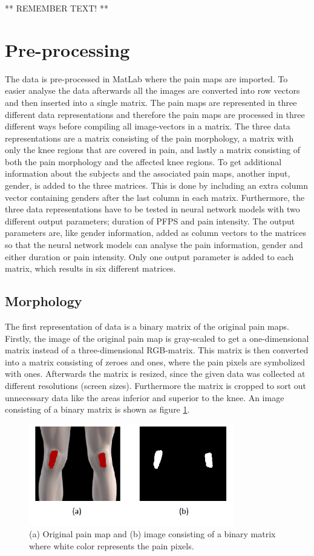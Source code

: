 ** REMEMBER TEXT! **

\section{Pre-processing}
The data is pre-processed in MatLab where the pain maps are imported. To easier analyse the data afterwards all the images are converted into row vectors and then inserted into a single matrix. The pain maps are represented in three different data representations and therefore the pain maps are processed in three different ways before compiling all image-vectors in a matrix. 
The three data representations are a matrix consisting of the pain morphology, a matrix with only the knee regions that are covered in pain, and lastly a matrix consisting of both the pain morphology and the affected knee regions. 
To get additional information about the subjects and the associated pain maps, another input, gender, is added to the three matrices. This is done by including an extra column vector containing genders after the last column in each matrix. 
Furthermore, the three data representations have to be tested in neural network models with two different output parameters; duration of PFPS and pain intensity. The output parameters are, like gender information, added as column vectors to the matrices so that the neural network models can analyse the pain information, gender and either duration or pain intensity. Only one output parameter is added to each matrix, which results in six different matrices.

\subsection{Morphology} \label{sec:Morph}
The first representation of data is a binary matrix of the original pain maps. 
Firstly, the image of the original pain map is gray-scaled to get a one-dimensional matrix instead of a three-dimensional RGB-matrix. This matrix is then converted into a matrix consisting of zeroes and ones, where the pain pixels are symbolized with ones. Afterwards the matrix is resized, since the given data was collected at different resolutions (screen sizes). Furthermore the matrix is cropped to sort out unnecessary data like the areas inferior and superior to the knee. An image consisting of a binary matrix is shown as figure \ref{fig:cropbin7}.

\begin{figure} [H]
\centering
\includegraphics[width=0.8\textwidth]{figures/cropbin7}
\caption{(a) Original pain map and (b) image consisting of a binary matrix where white color represents the pain pixels.}
\label{fig:cropbin7}
\end{figure}

